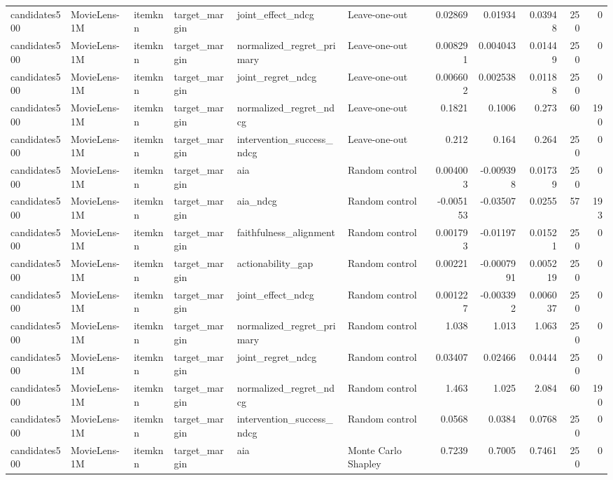 \begin{table}[t]
{\begin{tabular}{llllllrrrrr}
candidates500 & MovieLens-1M & itemknn & target\_margin & joint\_effect\_ndcg & Leave-one-out & 0.02869 & 0.01934 & 0.03948 & 250 & 0 \\
candidates500 & MovieLens-1M & itemknn & target\_margin & normalized\_regret\_primary & Leave-one-out & 0.008291 & 0.004043 & 0.01449 & 250 & 0 \\
candidates500 & MovieLens-1M & itemknn & target\_margin & joint\_regret\_ndcg & Leave-one-out & 0.006602 & 0.002538 & 0.01188 & 250 & 0 \\
candidates500 & MovieLens-1M & itemknn & target\_margin & normalized\_regret\_ndcg & Leave-one-out & 0.1821 & 0.1006 & 0.273 & 60 & 190 \\
candidates500 & MovieLens-1M & itemknn & target\_margin & intervention\_success\_ndcg & Leave-one-out & 0.212 & 0.164 & 0.264 & 250 & 0 \\
candidates500 & MovieLens-1M & itemknn & target\_margin & aia & Random control & 0.004003 & -0.009398 & 0.01739 & 250 & 0 \\
candidates500 & MovieLens-1M & itemknn & target\_margin & aia\_ndcg & Random control & -0.005153 & -0.03507 & 0.0255 & 57 & 193 \\
candidates500 & MovieLens-1M & itemknn & target\_margin & faithfulness\_alignment & Random control & 0.001793 & -0.01197 & 0.01521 & 250 & 0 \\
candidates500 & MovieLens-1M & itemknn & target\_margin & actionability\_gap & Random control & 0.00221 & -0.0007991 & 0.005219 & 250 & 0 \\
candidates500 & MovieLens-1M & itemknn & target\_margin & joint\_effect\_ndcg & Random control & 0.001227 & -0.003392 & 0.006037 & 250 & 0 \\
candidates500 & MovieLens-1M & itemknn & target\_margin & normalized\_regret\_primary & Random control & 1.038 & 1.013 & 1.063 & 250 & 0 \\
candidates500 & MovieLens-1M & itemknn & target\_margin & joint\_regret\_ndcg & Random control & 0.03407 & 0.02466 & 0.0444 & 250 & 0 \\
candidates500 & MovieLens-1M & itemknn & target\_margin & normalized\_regret\_ndcg & Random control & 1.463 & 1.025 & 2.084 & 60 & 190 \\
candidates500 & MovieLens-1M & itemknn & target\_margin & intervention\_success\_ndcg & Random control & 0.0568 & 0.0384 & 0.0768 & 250 & 0 \\
candidates500 & MovieLens-1M & itemknn & target\_margin & aia & Monte Carlo Shapley & 0.7239 & 0.7005 & 0.7461 & 250 & 0 \\

\end{tabular}}
\end{table}
